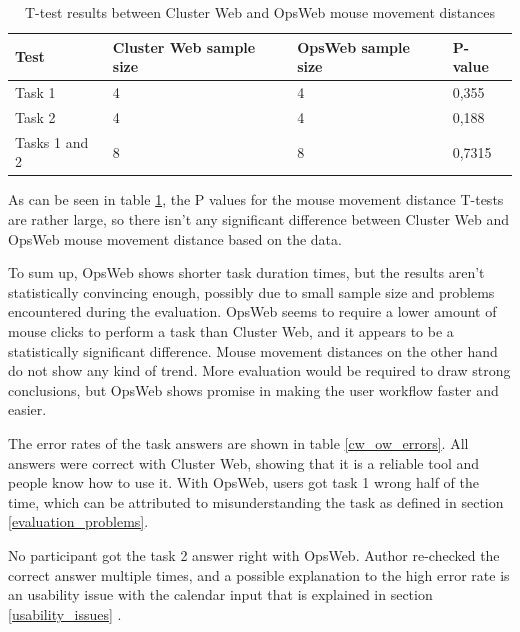 \begin{table}[!ht]
\def\arraystretch{1.1}%
    \begin{center}
    \caption{T-test results between Cluster Web and OpsWeb mouse movement distances}
    \label{cw_ow_distances_t_test}
    \begin{tabular}{| l | l | l | l | }
    \hline
    Test & Cluster Web sample size & OpsWeb sample size  & P-value   \\
    \hline
    Task 1 & 4 & 4 & 0,355 \\
    Task 2 & 4 & 4 & 0,188 \\
    Tasks 1 and 2 & 8 & 8 & 0,7315 \\
    \hline
    \end{tabular}
    \end{center}
\end{table}

As can be seen in table \ref{cw_ow_distances_t_test}, the P values for the mouse movement distance T-tests are rather large, so there isn't any significant difference between Cluster Web and OpsWeb mouse movement distance based on the data.

To sum up, OpsWeb shows shorter task duration times, but the results aren't statistically convincing enough, possibly due to small sample size and problems encountered during the evaluation. OpsWeb seems to require a lower amount of mouse clicks to perform a task than Cluster Web, and it appears to be a statistically significant difference. Mouse movement distances on the other hand do not show any kind of trend. More evaluation would be required to draw strong conclusions, but OpsWeb shows promise in making the user workflow faster and easier.

The error rates of the task answers are shown in table \ref{cw_ow_errors}. All answers were correct with Cluster Web, showing that it is a reliable tool and people know how to use it. With OpsWeb, users got task 1 wrong half of the time, which can be attributed to misunderstanding the task as defined in section \ref{evaluation_problems}. 

No participant got the task 2 answer right with OpsWeb. Author re-checked the correct answer multiple times, and a possible explanation to the high error rate is an usability issue with the calendar input that is explained in section \ref{usability_issues} .


